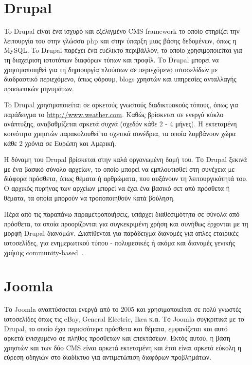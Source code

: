 \documentclass[12pt]{report}
\begin{document}
\section{\textlatin{Drupal}}
To \textlatin{Drupal} είναι ένα ισχυρό και εξελιγμένο \textlatin{CMS framework} το οποίο στηρίζει την λειτουργία του στην γλώσσα \textlatin{php} και στην ύπαρξη μιας βάσης δεδομένων, όπως η \textlatin{MySQL}. To  \textlatin{Drupal} παρέχει ένα ευέλικτο περιβάλλον, το οποίο χρησιμοποιείται για τη διαχείριση ιστοτόπων διαφόρων τύπων και προφίλ. Το \textlatin{Drupal} μπορεί να χρησιμοποιηθεί για τη δημιουργία πλούσιων σε περιεχόμενο ιστοσελίδων με διαδραστικό περιεχόμενο, όπως φόρουμ, \textlatin{blogs} χρηστών και υπηρεσίες ανταλλαγής προσωπικών μηνυμάτων.

To \textlatin{Drupal} χρησιμοποιείται σε αρκετούς γνωστούς διαδικτυακούς τόπους, όπως για παράδειγμα το \textlatin{\url{http://www.weather.com}}. Καθώς βρίσκεται σε ενεργό κύκλο ανάπτυξης, αναβαθμίζεται αρκετά συχνά (σχεδόν κάθε 2 - 4 μήνες). Η εκτεταμένη κοινότητα χρηστών παρακολουθεί τα σχετικά συνέδρια, τα οποία λαμβάνουν χώρα κάθε 2 χρόνια σε Ευρώπη και Αμερική.

Η δύναμη του \textlatin{Drupal} βρίσκεται στην καλά οργανωμένη δομή του. Το \textlatin{Drupal} ξεκινά με ένα βασικό σύνολο αρχείων, το οποίο μπορεί να εμπλουτισθεί στη συνέχεια με διάφορα πρόσθετα, όπως θέματα ή αρθρώματα, που αυξάνουν τη λειτουργικότητά του. Ο αρχικός πυρήνας των αρχείων μπορεί να έχει ένα βασικό σετ από πρόσθετα ή θέματα, τα οποία μπορούν να τροποποιηθούν κατά βούληση.

Πέρα από τις παραπάνω παραμετροποιήσεις, υπάρχει διαθεσιμότητα σε σύνολα από πρόσθετα, τα οποία προορίζονται για συγκεκριμένη χρήση και συνήθως έρχονται με τη μορφή \textlatin{Drupal} διανομών. Διατίθενται για παράδειγμα διανομές για απλές εταιρικές ιστοσελίδες, για ενημερωτικού τύπου - πολυμεσικές ή ακόμα και διανομές γενικής χρήσης \textlatin{community-based}~\cite{opensource_cms_demos_and_information}.

\section{\textlatin{Joomla}}
Το \textlatin{Joomla} αναπτύσσεται ενεργά από το 2005 και χρησιμοποιείται σε πολύ γνωστές ιστοσελίδες όπως τις \textlatin{eBay, General Electric, Ikea} κ.α. Το \textlatin{Joomla} συγκριτικά με το \textlatin{Drupal}, το οποίο έχει περισσότερα πρόσθετα και θέματα, εμφανίζεται και αυτό αρκετά ενισχυμένο σε πλήθος πρόσθετων και επεκτάσεων. Εκτός αυτού, η βάση χρηστών και των δύο \textlatin{CMS} είναι αρκετά εκτεταμένη και έτσι είναι αρκετά εύκολη η εύρεση οδηγιών στο διαδίκτυο για αντιμετώπιση διαφόρων προβλημάτων.
\end{document}
